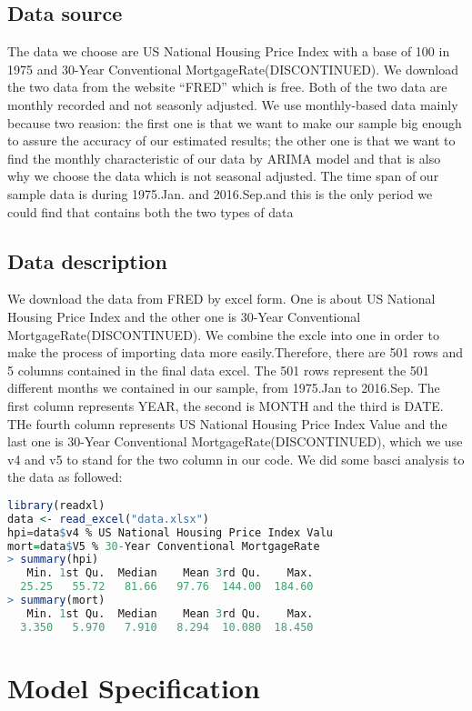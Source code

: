 \documentclass[12pt,letterpaper]{article}
\begin{document}
\subsection{Data source}
The data we choose are US National Housing Price Index with a base of 100 in 1975 and 30-Year Conventional MortgageRate(DISCONTINUED). 
We download the two data from the website ``FRED'' which is free. 
Both of the two data are monthly recorded and not seasonly adjusted. 
We use monthly-based data mainly because two reasion: the first one is that we want to make our sample big enough to assure the accuracy of our estimated results; the other one is that we  want to find the monthly characteristic of our data by ARIMA model and that is also why we choose the data which is not seasonal adjusted.
The time span of our sample data is during 1975.Jan. and 2016.Sep.and this is the only period we could find that contains both the two types of data

\subsection{Data description}
We download the data from FRED by excel form. One is about US National Housing Price Index and the other one is 30-Year Conventional MortgageRate(DISCONTINUED).
We combine the excle into one in order to make the process of importing data more easily.Therefore, there are 501 rows and 5 columns contained in the final data excel.
The 501 rows represent the 501 different months we contained in our sample, from 1975.Jan to 2016.Sep.
The first column represents YEAR, the second is MONTH and the third is DATE.
THe fourth column represents  US National Housing Price Index Value and the last one is 30-Year Conventional MortgageRate(DISCONTINUED), which we use v4 and v5 to stand for the two column in our code.
We did some basci analysis to the data as followed:

\begin{lstlisting}[language=R]
library(readxl)
data <- read_excel("data.xlsx")
hpi=data$v4 % US National Housing Price Index Valu
mort=data$V5 % 30-Year Conventional MortgageRate
> summary(hpi)
   Min. 1st Qu.  Median    Mean 3rd Qu.    Max. 
  25.25   55.72   81.66   97.76  144.00  184.60 
> summary(mort)
   Min. 1st Qu.  Median    Mean 3rd Qu.    Max. 
  3.350   5.970   7.910   8.294  10.080  18.450
\end{lstlisting}

         
\section{Model Specification}
\end{document}
